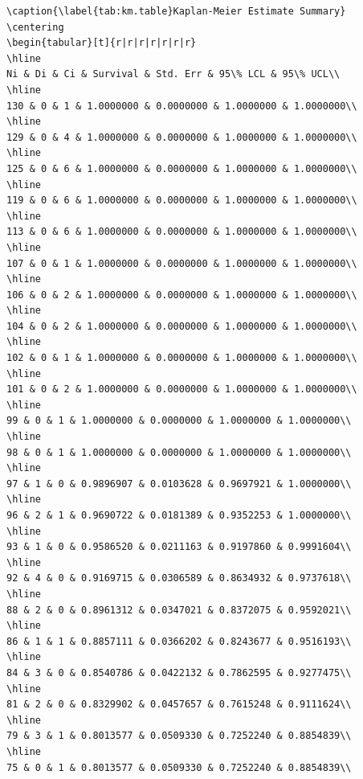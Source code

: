 \documentclass[
]{article}
\begin{document}
\begin{verbatim}
\caption{\label{tab:km.table}Kaplan-Meier Estimate Summary}
\centering
\begin{tabular}[t]{r|r|r|r|r|r|r}
\hline
Ni & Di & Ci & Survival & Std. Err & 95\% LCL & 95\% UCL\\
\hline
130 & 0 & 1 & 1.0000000 & 0.0000000 & 1.0000000 & 1.0000000\\
\hline
129 & 0 & 4 & 1.0000000 & 0.0000000 & 1.0000000 & 1.0000000\\
\hline
125 & 0 & 6 & 1.0000000 & 0.0000000 & 1.0000000 & 1.0000000\\
\hline
119 & 0 & 6 & 1.0000000 & 0.0000000 & 1.0000000 & 1.0000000\\
\hline
113 & 0 & 6 & 1.0000000 & 0.0000000 & 1.0000000 & 1.0000000\\
\hline
107 & 0 & 1 & 1.0000000 & 0.0000000 & 1.0000000 & 1.0000000\\
\hline
106 & 0 & 2 & 1.0000000 & 0.0000000 & 1.0000000 & 1.0000000\\
\hline
104 & 0 & 2 & 1.0000000 & 0.0000000 & 1.0000000 & 1.0000000\\
\hline
102 & 0 & 1 & 1.0000000 & 0.0000000 & 1.0000000 & 1.0000000\\
\hline
101 & 0 & 2 & 1.0000000 & 0.0000000 & 1.0000000 & 1.0000000\\
\hline
99 & 0 & 1 & 1.0000000 & 0.0000000 & 1.0000000 & 1.0000000\\
\hline
98 & 0 & 1 & 1.0000000 & 0.0000000 & 1.0000000 & 1.0000000\\
\hline
97 & 1 & 0 & 0.9896907 & 0.0103628 & 0.9697921 & 1.0000000\\
\hline
96 & 2 & 1 & 0.9690722 & 0.0181389 & 0.9352253 & 1.0000000\\
\hline
93 & 1 & 0 & 0.9586520 & 0.0211163 & 0.9197860 & 0.9991604\\
\hline
92 & 4 & 0 & 0.9169715 & 0.0306589 & 0.8634932 & 0.9737618\\
\hline
88 & 2 & 0 & 0.8961312 & 0.0347021 & 0.8372075 & 0.9592021\\
\hline
86 & 1 & 1 & 0.8857111 & 0.0366202 & 0.8243677 & 0.9516193\\
\hline
84 & 3 & 0 & 0.8540786 & 0.0422132 & 0.7862595 & 0.9277475\\
\hline
81 & 2 & 0 & 0.8329902 & 0.0457657 & 0.7615248 & 0.9111624\\
\hline
79 & 3 & 1 & 0.8013577 & 0.0509330 & 0.7252240 & 0.8854839\\
\hline
75 & 0 & 1 & 0.8013577 & 0.0509330 & 0.7252240 & 0.8854839\\

\end{verbatim}
\end{document}
